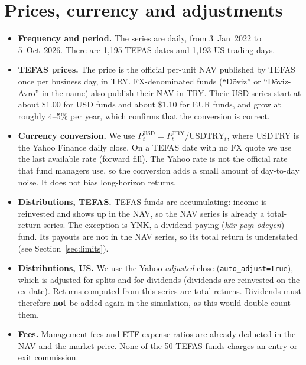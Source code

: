 \documentclass[11pt,a4paper]{article}
\newcommand{\code}[1]{\texttt{\small #1}}
\begin{document}
\section{Prices, currency and adjustments}
\begin{itemize}
  \item \textbf{Frequency and period.} The series are daily, from 3~Jan~2022 to 5~Oct~2026.
        There are 1{,}195 TEFAS dates and 1{,}193 US trading days.
  \item \textbf{TEFAS prices.} The price is the official per-unit NAV published by TEFAS
        once per business day, in TRY. FX-denominated funds (``Döviz'' or ``Döviz-Avro''
        in the name) also publish their NAV in TRY. Their USD series start at about
        \$1.00 for USD funds and about \$1.10 for EUR funds, and grow at roughly 4--5\% per
        year, which confirms that the conversion is correct.
  \item \textbf{Currency conversion.} We use $P^{\text{USD}}_t = P^{\text{TRY}}_t / \text{USDTRY}_t$,
        where USDTRY is the Yahoo Finance daily close. On a TEFAS date with no FX quote we
        use the last available rate (forward fill). The Yahoo rate is not the official
        rate that fund managers use, so the conversion adds a small amount of day-to-day
        noise. It does not bias long-horizon returns.
  \item \textbf{Distributions, TEFAS.} TEFAS funds are accumulating: income is reinvested
        and shows up in the NAV, so the NAV series is already a total-return series. The
        exception is YNK, a dividend-paying (\emph{kâr payı ödeyen}) fund. Its payouts are
        not in the NAV series, so its total return is understated (see
        Section~\ref{sec:limits}).
  \item \textbf{Distributions, US.} We use the Yahoo \emph{adjusted} close
        (\code{auto\_adjust=True}), which is adjusted for splits and for dividends
        (dividends are reinvested on the ex-date). Returns computed from this series are
        total returns. Dividends must therefore \textbf{not} be added again in the
        simulation, as this would double-count them.
  \item \textbf{Fees.} Management fees and ETF expense ratios are already deducted in the
        NAV and the market price. None of the 50 TEFAS funds charges an entry or exit
        commission.
\end{itemize}
\end{document}
